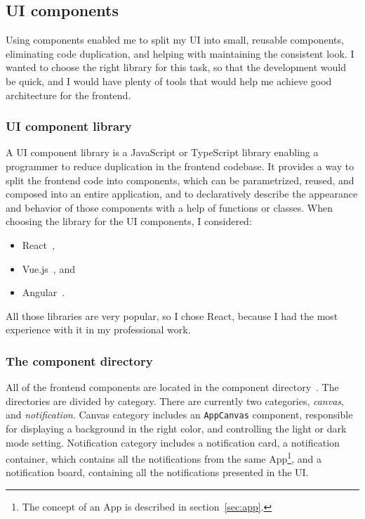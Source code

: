 \subsection{UI components}\label{sec:ui-components}

Using components enabled me to split my UI
into small, reusable components,
eliminating code duplication,
and helping with maintaining the consistent look.
I wanted to choose the right library
for this task,
so that the development would be quick,
and I would have plenty of tools
that would help me achieve
good architecture for the frontend.

\subsubsection{UI component library}\label{sec:ui-component-library}

A UI component library is a JavaScript or TypeScript library
enabling a programmer to reduce duplication
in the frontend codebase.
It provides a way to split the frontend code into components,
which can be parametrized, reused, and composed into an entire application,
and to declaratively describe
the appearance and behavior of those components
with a help of functions or classes.
When choosing the library for the UI components, I considered:

\begin{itemize}
  \item
        React~\cite{oshannessy_react_2022},
  \item
        Vue.js~\cite{you_vuejs_2022}, and
  \item
        Angular~\cite{kalpakas_angular_2022}.
\end{itemize}

All those libraries are very popular,
so I chose React,
because I had the most experience with it in my professional work.

\subsubsection{The component directory}\label{sec:the-component-directory}

All of the frontend components
are located in the component directory~\cite{sewera_notipie_2022-3}.
The directories are divided by category.
There are currently two categories,
\textit{canvas}, and
\textit{notification}.
Canvas category includes
an \texttt{AppCanvas} component,
responsible for displaying
a background in the right color,
and controlling the light or dark mode setting.
Notification category includes
a notification card,
a notification container,
which contains all the notifications
from the same App\footnote{
  The concept of an App is described
  in section~\ref{sec:app}.
}, and a notification board,
containing all the notifications
presented in the UI.

